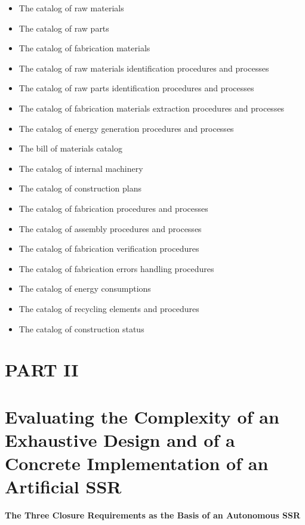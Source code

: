 \begin{itemize}
\item The catalog of raw materials
\item The catalog of raw parts
\item The catalog of fabrication materials
\item The catalog of raw materials identification procedures and
processes
\item The catalog of raw parts identification procedures and processes
\item The catalog of fabrication materials extraction procedures and
processes
\item The catalog of energy generation procedures and processes
\item The bill of materials catalog
\item The catalog of internal machinery
\item The catalog of construction plans
\item The catalog of fabrication procedures and processes
\item The catalog of assembly procedures and processes
\item The catalog of fabrication verification procedures
\item The catalog of fabrication errors handling procedures
\item The catalog of energy consumptions
\item The catalog of recycling elements and procedures
\item The catalog of construction status
\end{itemize}

\bigskip

\clearpage\section[PART II]{PART II}
\hypertarget{RefHeading3112306210128}{}\section[Evaluating the
Complexity of an Exhaustive Design and of a Concrete Implementation of
an Artificial SSR]{Evaluating the Complexity of an Exhaustive Design
and of a Concrete Implementation of an Artificial SSR}
\hypertarget{RefHeading3114306210128}{}
\bigskip

{\bfseries
\hypertarget{RefHeading3116306210128}{}The Three Closure Requirements as
the Basis of an Autonomous SSR}

